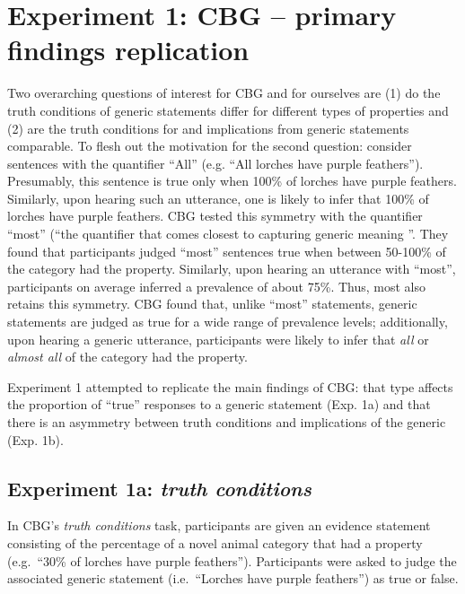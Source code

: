 \documentclass[10pt,letterpaper]{article}
\begin{document}
\section{Experiment 1: CBG -- primary findings replication}

Two overarching questions of interest for CBG and for ourselves are (1) do the truth conditions of generic statements differ for different types of properties and (2) are the truth conditions for and implications from generic statements comparable. To flesh out the motivation for the second question: consider sentences with the quantifier ``All'' (e.g. ``All lorches have purple feathers''). Presumably, this sentence is true only when 100\% of lorches have purple feathers. Similarly, upon hearing such an utterance, one is likely to infer that 100\% of lorches have purple feathers. CBG tested this symmetry with the quantifier ``most'' (``the quantifier that comes closest to capturing generic meaning \cite{Carlson1977,Cimpian2010b}''. They found that participants judged ``most'' sentences true when between 50-100\% of the category had the property. Similarly, upon hearing an utterance with ``most'', participants on average inferred a prevalence of about 75\%. Thus, most also retains this symmetry. CBG found that, unlike ``most'' statements, generic statements are judged as true for a wide range of prevalence levels; additionally, upon hearing a generic utterance, participants were likely to infer that \emph{all} or \emph{almost all} of the category had the property.



Experiment 1 attempted to replicate the main findings of CBG: that type affects the proportion of ``true'' responses to a generic statement (Exp. 1a) and that there is an asymmetry between truth conditions and implications of the generic (Exp. 1b). 

\subsection{Experiment 1a: \emph{truth conditions}}

In CBG's \emph{truth conditions} task, participants are given an evidence statement consisting of the percentage of a novel animal category that had a property (e.g.~``30\% of lorches have purple feathers''). Participants were asked to judge the associated generic statement (i.e.~``Lorches have purple feathers'') as true or false. 
\end{document}
